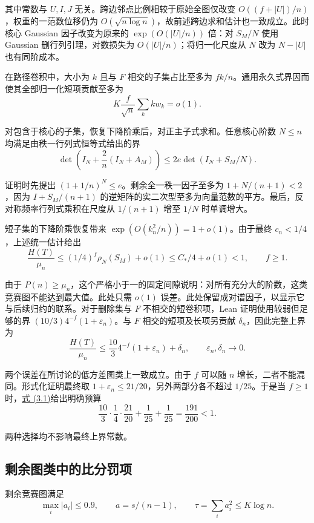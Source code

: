 \documentclass[11pt,a4paper]{article}
\newcommand{\paperref}[2]{\hyperref[#1]{#2}}
\begin{document}
其中常数与 \(U,I,J\) 无关。跨边邻点比例相较于原始全图仅改变 \(O((f+|U|)/n)\)，权重的一范数位移仍为 \(O(\sqrt{n\log n})\)，故前述跨边求和估计也一致成立。此时核心 Gaussian 因子改变为原来的 \(\exp(O(|U|/n))\) 倍：对 \(S_M/N\) 使用 Gaussian 删行列引理，对数损失为 \(O(|U|/n)\)；将归一化尺度从 \(N\) 改为 \(N-|U|\) 也有同阶成本。

在路径卷积中，大小为 \(k\) 且与 \(F\) 相交的子集占比至多为 \(fk/n\)。通用永久式界因而使其全部归一化短项贡献至多为
\[K\frac f{\sqrt n}\sum_k kw_k=o(1).\]

对包含于核心的子集，恢复下降阶乘后，对正主子式求和。任意核心阶数 \(N\le n\) 均满足由秩一行列式恒等式给出的界
\[\det\left(I_N+\frac2n(I_N+A_M)\right)
\le2e\det(I_N+S_M/N).\]

证明时先提出 \((1+1/n)^N\le e\)。剩余全一秩一因子至多为 \(1+N/(n+1)<2\)，因为 \(I+S_M/(n+1)\) 的逆矩阵的实二次型至多为向量范数的平方。最后，反对称频率行列式乘积在尺度从 \(1/(n+1)\) 增至 \(1/N\) 时单调增大。

短子集的下降阶乘恢复带来 \(\exp(O(k_n^2/n))=1+o(1)\)。由于最终 \(c_n<1/4\)，上述统一估计给出
\[\frac{H(T)}{\mu_n}
\le(1/4)^f\rho_N(S_M)+o(1)
\le C_*/4+o(1)<1,\qquad f\ge1.\]

由于 \(P(n)\ge\mu_n\)，这个严格小于一的固定间隙说明：对所有充分大的阶数，这类竞赛图不能达到最大值。此处只需 \(o(1)\) 误差。此处保留成对谱因子，以显示它与后续归约的联系。对于删除集与 \(F\) 不相交的短卷积项，Lean 证明使用较弱但足够的界 \((10/3)4^{-f}(1+\varepsilon_n)\)。与 \(F\) 相交的短项及长项另贡献 \(\delta_n\)，因此完整上界为
\begin{equation}
\frac{H(T)}{\mu_n}\le\frac{10}{3}4^{-f}(1+\varepsilon_n)+\delta_n,
\qquad \varepsilon_n,\delta_n\longrightarrow0.
\tag{3.1}\label{eq-exceptional-bound}
\end{equation}

两个误差在所讨论的低方差图类上一致成立。由于 \(f\) 可以随 \(n\) 增长，二者不能混同。形式化证明最终取 \(1+\varepsilon_n\le21/20\)，另外两部分各不超过 \(1/25\)。于是当 \(f\ge1\) 时，\paperref{eq-exceptional-bound}{式 (3.1)}给出明确预算
\[\frac{10}{3}\cdot\frac14\cdot\frac{21}{20}+\frac1{25}+\frac1{25}
=\frac{191}{200}<1.\]

两种选择均不影响最终上界常数。

\subsection{剩余图类中的比分罚项}\label{sec-3.4}

剩余竞赛图满足
\[\max_i|a_i|\le0.9,\qquad
a=s/(n-1),\qquad \tau=\sum_i a_i^2\le K\log n.\]
\end{document}
